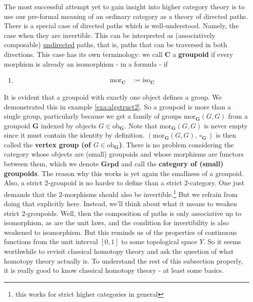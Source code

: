 The most successful attempt yet to gain insight into higher category theory is to use our pre-formal meaning of an ordinary category as a theory of directed paths.
There is a special case of directed paths which is well-understood.
Namely, the case when they are invertible.
This can be interpreted as (associatively composable) \underline{undirected} paths, that is, paths that can be traversed in both directions.
This case has its own terminology: we call $\mathbf{C}$ a \textbf{groupoid} if every morphism is already an isomorphism - in a formula - if
\begin{enumerate}
\item[(Grpd)]
\begin{align*}
  \mathrm{mor}_{\mathbf{C}}
  &:=
  \mathrm{iso}_{\mathbf{C}}
\end{align*}
\end{enumerate}
It is evident that a groupoid with exactly one object defines a group.
We demonstrated this in example \ref{exa:algstruct2}.
So a groupoid is more than a single group, particularly because we get a family of groups $\mathrm{mor}_{\mathbf{G}}(G,G)$ from a groupoid $\mathbf{G}$ indexed by objects $G \in \mathrm{ob}_{\mathbf{G}}$.
Note that $\mathrm{mor}_{\mathbf{G}}(G,G)$ is never empty since it must contain the identity by definition.
$(\mathrm{mor}_{\mathbf{G}}(G,G),\circ_{\mathbf{G}})$ is then called the \textbf{vertex group (of $G \in \mathrm{ob}_{\mathbf{G}}$)}.
There is no problem considering the category whose objects are (small) groupoids and whose morphisms are functors between them, which we denote $\mathbf{Grpd}$ and call the \textbf{category of (small) groupoids}.
The reason why this works is yet again the smallness of a groupoid.
Also, a strict $2$-groupoid is no harder to define than a strict $2$-category.
One just demands that the $2$-morphisms should also be invertible.\footnote{this works for strict higher categories in general} But we refrain from doing that explicitly here.
Instead, we'll think about what it means to weaken strict $2$-groupoids.
Well, then the composition of paths is only associative up to isomorphism, as are the unit laws, and the condition for invertibility is also weakened to isomorphism.
But this reminds us of the properties of continuous functions from the unit interval $[0,1]$ to some topological space $Y$.
So it seems worthwhile to revisit classical homotopy theory and ask the question of what homotopy theory actually is.
To understand the rest of this subsection properly, it is really good to know classical homotopy theory - at least some basics.

